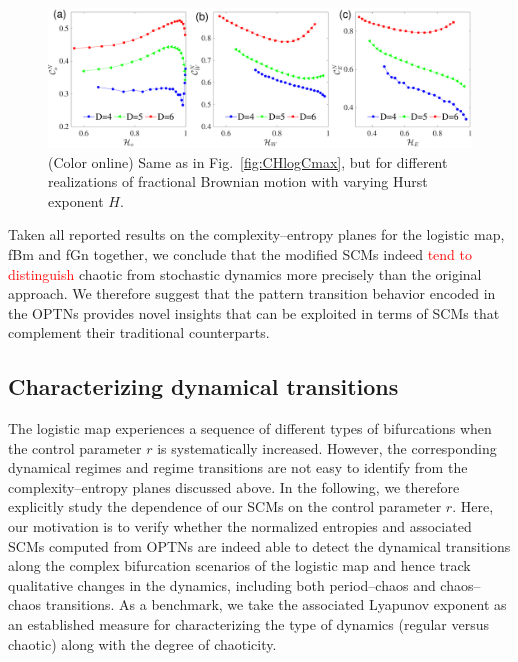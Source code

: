 \documentclass[aip,cha,reprint,nofootinbib]{revtex4-1}
\begin{document}
\begin{figure}
        \centering
        \includegraphics[width=2\columnwidth]{CompEntropyCNormalized_fBm.pdf}
\caption{\color{red}(Color online) Same as in Fig.~\ref{fig:CHlogCmax}, but for different realizations of fractional Brownian motion with varying Hurst exponent $H$.  \label{fig:CHfbmCmax}}
\end{figure}

Taken all reported results on the complexity--entropy planes for the logistic map, fBm and fGn together, we conclude that the modified SCMs indeed \textcolor{red}{tend to distinguish} chaotic from stochastic dynamics more precisely than the original approach. We therefore suggest that the pattern transition behavior encoded in the OPTNs provides novel insights that can be exploited in terms of SCMs that complement their traditional counterparts. 


\subsection{Characterizing dynamical transitions} \label{sec:transi}
The logistic map experiences a sequence of different types of bifurcations when the control parameter $r$ is systematically increased. However, the corresponding dynamical regimes and regime transitions are not easy to identify from the complexity--entropy planes discussed above. In the following, we therefore explicitly study the dependence of our SCMs on the control parameter $r$. Here, our motivation is to verify whether the normalized entropies and associated SCMs computed from OPTNs are indeed able to detect the dynamical transitions along the complex bifurcation scenarios of the logistic map and hence track qualitative changes in the dynamics, including both period--chaos and chaos--chaos transitions. As a benchmark, we take the associated Lyapunov exponent as an established measure for characterizing the type of dynamics (regular versus chaotic) along with the degree of chaoticity.
\end{document}
